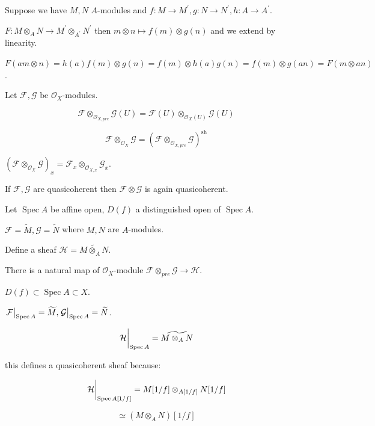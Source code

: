 \documentclass{article}
\theoremstyle{definition}
\begin{document}
    Suppose we have \(M,N\) \(A\)-modules and \(f:M \to M^{\prime} , g:N \to N^{\prime} , h:A \to A^{\prime} \).

    \(F:M \otimes_A N \to M^{\prime} \otimes_{A^{\prime}} N^{\prime}\) then \(m \otimes n \mapsto f(m) \otimes g(n)\) and we extend by linearity.
    
    \(F(am \otimes n) = h(a)f(m)\otimes g(n) = f(m) \otimes h(a)g(n) = f(m) \otimes g(an) = F(m \otimes an)\).
    
    Let \(\mathcal{F} , \mathcal{G} \text{ be } \mathcal{O}_X\)-modules.

    
    \[
        \mathcal{F} \otimes_{\mathcal{O}_{X,pre}} \mathcal{G} (U) = \mathcal{F}(U) \otimes_{\mathcal{O}_X(U)} \mathcal{G}(U)
    \]

    \[
        \mathcal{F} \otimes_{\mathcal{O}_X} \mathcal{G} = (\mathcal{F} \otimes_{\mathcal{O}_{X,pre}} \mathcal{G}) ^{\operatorname{sh}}
    \]

    \((\mathcal{F} \otimes_{\mathcal{O}_X} \mathcal{G})_x = \mathcal{F}_x \otimes_{\mathcal{O}_{X,x}} \mathcal{G}_x\).

    If \(\mathcal{F} , \mathcal{G} \) are quasicoherent then \(\mathcal{F} \otimes \mathcal{G}\) is again quasicoherent.

    Let \(\operatorname{Spec} A\) be affine open, \(D(f)\) a distinguished open of \(\operatorname{Spec} A\). 

    \(\mathcal{F} = \widetilde{M} , \mathcal{G} = \widetilde{N}\) where \(M,N\) are \(A\)-modules.

    Define a sheaf \(\mathcal{H} = \widetilde{M \otimes_A N}\).
    
    There is a natural map of \(\mathcal{O}_X\)-module \(\mathcal{F} \otimes_{pre} \mathcal{G} \to \mathcal{H}\).

    \(D(f) \subset \operatorname{Spec} A \subset X\).

    \(\eval{\mathcal{F}}_{\operatorname{Spec} A} = \widetilde{M}, \eval{\mathcal{G}}_{\operatorname{Spec} A} = \widetilde{N}\).
    
    \[
        \eval{\mathcal{H}}_{\operatorname{Spec} A}  = \widetilde{M \otimes_A N} 
    \]

    this defines a quasicoherent sheaf because:

    \[
        \eval{\mathcal{H}}_{\operatorname{Spec} A[1 / f]} = M[1 / f] \otimes_{A[1 / f]} N[1 / f]
    \]

    \[
        \simeq (M \otimes_A N)[1 / f]
    \]
\end{document}
